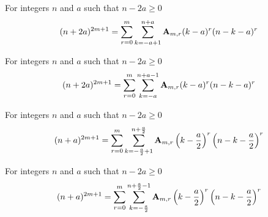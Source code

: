 \begin{corollary}
    \label{prop:odd-power-binomial-plus}
    For integers $n$ and $a$ such that $n-2a \geq 0$
    \begin{align*}
    (n+2a)
        ^{2m+1} = \sum_{r=0}^{m} \sum_{k=-a+1}^{n+a} {\mathbf{A}} \sb{m,r} (k-a)^r (n-k-a)^r
    \end{align*}
\end{corollary}

\begin{corollary}
    \label{prop:odd-power-binomial-plus-shifted}
    For integers $n$ and $a$ such that $n-2a \geq 0$
    \begin{align*}
    (n+2a)
        ^{2m+1} = \sum_{r=0}^{m} \sum_{k=-a}^{n+a-1} {\mathbf{A}} \sb{m,r} (k-a)^r (n-k-a)^r
    \end{align*}
\end{corollary}

\begin{corollary}
    For integers $n$ and $a$ such that $n-2a \geq 0$
    \begin{align*}
    (n+a)
        ^{2m+1} = \sum_{r=0}^{m} \sum_{k=-\frac{a}{2}+1}^{n+\frac{a}{2}} {\mathbf{A}} \sb{m,r} \left( k-\frac{a}{2} \right)^r \left( n-k-\frac{a}{2} \right)^r
    \end{align*}
\end{corollary}

\begin{corollary}
    For integers $n$ and $a$ such that $n-2a \geq 0$
    \begin{align*}
    (n+a)
        ^{2m+1} = \sum_{r=0}^{m} \sum_{k=-\frac{a}{2}}^{n+\frac{a}{2}-1} {\mathbf{A}} \sb{m,r} \left( k-\frac{a}{2} \right)^r \left( n-k-\frac{a}{2} \right)^r
    \end{align*}
\end{corollary}

